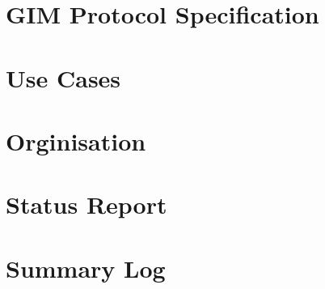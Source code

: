 \appendix
\chapter{GIM Protocol Specification}


\chapter{Use Cases}


\chapter{Orginisation}


\chapter{Status Report}


\chapter{Summary Log}

